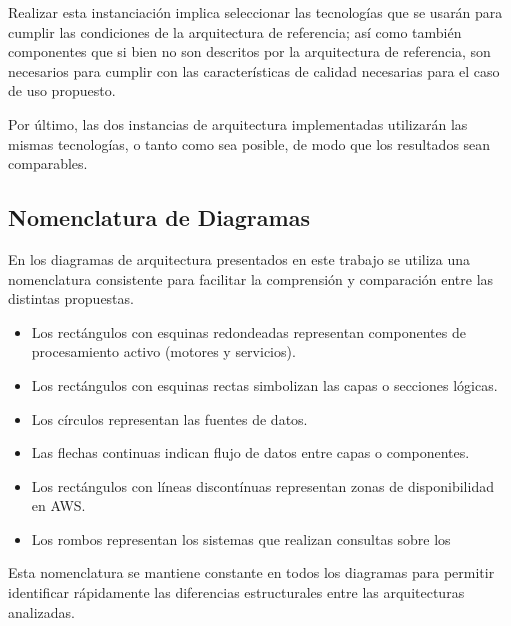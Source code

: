 Realizar esta instanciación implica seleccionar las tecnologías que se usarán para cumplir las condiciones de la arquitectura de referencia; 
así como también componentes que si bien no son descritos por la arquitectura de referencia, son necesarios para cumplir con las características de calidad
necesarias para el caso de uso propuesto.\newline

Por último, las dos instancias de arquitectura implementadas utilizarán las mismas tecnologías, o tanto como sea posible, de modo que los resultados sean comparables.  

\newpage

\subsection{Nomenclatura de Diagramas}

En los diagramas de arquitectura presentados en este trabajo se utiliza una nomenclatura consistente para facilitar la comprensión y comparación entre las distintas propuestas.

\begin{itemize}
    \item Los rectángulos con esquinas redondeadas representan componentes de procesamiento activo (motores y servicios).
    \item Los rectángulos con esquinas rectas simbolizan las capas o secciones lógicas.
    \item Los círculos representan las fuentes de datos.
    \item Las flechas continuas indican flujo de datos entre capas o componentes.
    \item Los rectángulos con líneas discontínuas representan zonas de disponibilidad en AWS.
    \item Los rombos representan los sistemas que realizan consultas sobre los
\end{itemize}
 
Esta nomenclatura se mantiene constante en todos los diagramas para permitir identificar rápidamente las diferencias estructurales entre las arquitecturas analizadas.
\newpage